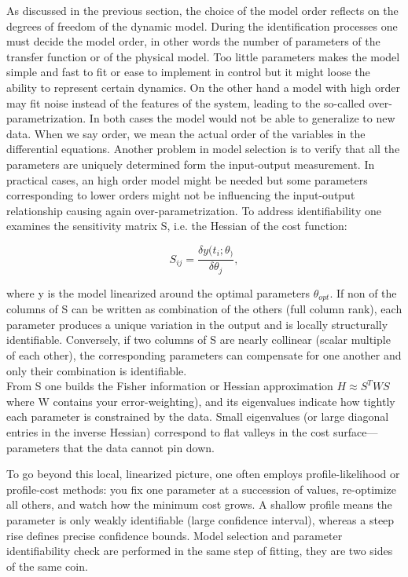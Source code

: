 As discussed in the previous section, the choice of the model order reflects on the degrees of freedom of the dynamic model. During the identification processes one must decide the model order, in other words the number of parameters of the transfer function or of the physical model. Too little parameters makes the model simple and fast to fit or ease to implement in control but it might loose the ability to represent certain dynamics. On the other hand a model with high order may fit noise instead of the features of the system, leading to the so-called over-parametrization. In both cases the model would not be able to generalize to new data. When we say order, we mean the actual order of the variables in the differential equations. Another problem in model selection is to verify that all the parameters are uniquely determined form the input-output measurement. In practical cases, an high order model might be needed but some parameters corresponding to lower orders might not be influencing the input-output relationship causing again over-parametrization. To address identifiability one examines the sensitivity matrix S, i.e. the Hessian of the cost function:

$$
S_{ij}=\frac{\delta y(t_i;\theta_)}{\delta \theta _j},
$$

where y is the model linearized around the optimal parameters $\theta _{opt}$. If non of the columns of S can be written as combination of the others (full column rank), each parameter produces a unique variation in the output and is locally structurally identifiable. Conversely, if two columns of S are nearly collinear (scalar multiple of each other), the corresponding parameters can compensate for one another and only their combination is identifiable.\\
From S one builds the Fisher information or Hessian approximation 
$H\approx S^TWS$
where W contains your error-weighting), and its eigenvalues indicate how tightly each parameter is constrained by the data. Small eigenvalues (or large diagonal entries in the inverse Hessian) correspond to flat valleys in the cost surface—parameters that the data cannot pin down.

To go beyond this local, linearized picture, one often employs profile-likelihood or profile-cost methods: you fix one parameter at a succession of values, re-optimize all others, and watch how the minimum cost grows. A shallow profile means the parameter is only weakly identifiable (large confidence interval), whereas a steep rise defines precise confidence bounds.
Model selection and parameter identifiability check are performed in the same step of fitting, they are two sides of the same coin.

